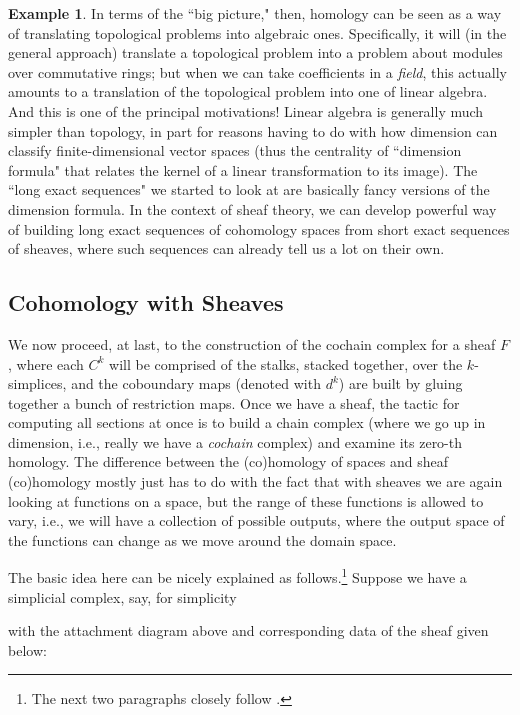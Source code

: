 \documentclass[a4paper]{book}
\theoremstyle{definition}
\newtheorem{example}{Example}[section]
\theoremstyle{definition}
\theoremstyle{definition}
\theoremstyle{theorem}
\theoremstyle{definition}
\begin{document}
\begin{example}
	 	In terms of the ``big picture," then, homology can be seen as a way of translating topological problems into algebraic ones. Specifically, it will (in the general approach) translate a topological problem into a problem about modules over commutative rings; but when we can take coefficients in a \textit{field}, this actually amounts to a translation of the topological problem into one of linear algebra. And this is one of the principal motivations! Linear algebra is generally much simpler than topology, in part for reasons having to do with how dimension can classify finite-dimensional vector spaces (thus the centrality of ``dimension formula" that relates the kernel of a linear transformation to its image). The ``long exact sequences" we started to look at are basically fancy versions of the dimension formula. In the context of sheaf theory, we can develop powerful way of building long exact sequences of cohomology spaces from short exact sequences of sheaves, where such sequences can already tell us a lot on their own.  
\subsection{Cohomology with Sheaves}
	We now proceed, at last, to the construction of the cochain complex for a sheaf $F$, where each $C^k$ will be comprised of the stalks, stacked together, over the $k$-simplices, and the coboundary maps (denoted with $d^k$) are built by gluing together a bunch of restriction maps. Once we have a sheaf, the tactic for computing all sections at once is to build a chain complex (where we go up in dimension, i.e., really we have a \textit{cochain} complex) and examine its zero-th homology. The difference between the (co)homology of spaces and sheaf (co)homology mostly just has to do with the fact that with sheaves we are again looking at functions on a space, but the range of these functions is allowed to vary, i.e., we will have a collection of possible outputs, where the output space of the functions can change as we move around the domain space. \par 
	The basic idea here can be nicely explained as follows.\footnote{The next two paragraphs closely follow \cite{robinson_topological_2014}.} Suppose we have a simplicial complex, say, for simplicity 
	\begin{center} 
	 \end{center} \par \noindent 
with the attachment diagram above and corresponding data of the sheaf given below: 
\par 
\begin{center} 
\end{center}
\end{example}
\end{document}
